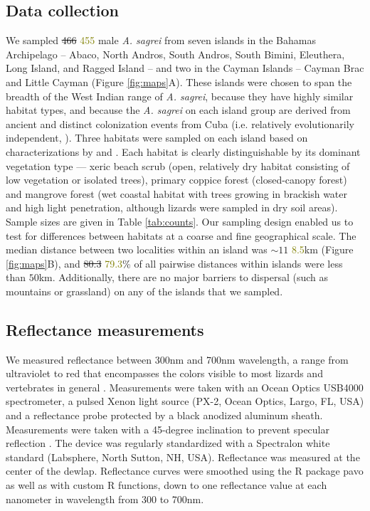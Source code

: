 \subsection*{Data collection}

We sampled \sout{466} \textcolor{olive}{455} male \textit{A. sagrei} from seven islands in the Bahamas Archipelago -- Abaco, North Andros, South Andros, South Bimini, Eleuthera, Long Island, and Ragged Island -- and two in the Cayman Islands -- Cayman Brac and Little Cayman (Figure \ref{fig:maps}A). These islands were chosen to span the breadth of the West Indian range of \textit{A. sagrei}, because they have highly similar habitat types,  and because the \textit{A. sagrei} on each island group are derived from ancient and distinct colonization events from Cuba (i.e. relatively evolutionarily independent, \citealt{Reynolds2020}). Three habitats were sampled on each island based on characterizations by \citet{Howard1950} and \citet{Schoener1968}. Each habitat is clearly distinguishable by its dominant vegetation type --- xeric beach scrub (open, relatively dry habitat consisting of low vegetation or isolated trees), primary coppice forest (closed-canopy forest) and mangrove forest (wet coastal habitat with trees growing in brackish water and high light penetration, although lizards were sampled in dry soil areas). Sample sizes are given in Table \ref{tab:counts}. Our sampling design enabled us to test for differences between habitats at a coarse and fine geographical scale. The median distance between two localities within an island was \sout{$\sim 11$} \textcolor{olive}{8.5}km (Figure \ref{fig:maps}B), and \sout{80.3} \textcolor{olive}{79.3}\% of all pairwise distances within islands were less than $50$km. Additionally, there are no major barriers to dispersal (such as mountains or grassland) on any of the islands that we sampled.

\subsection*{Reflectance measurements}

We measured reflectance between 300nm and 700nm wavelength, a range from ultraviolet to red that encompasses the colors visible to most lizards and vertebrates in general \citep{Lazareva2012}. Measurements were taken with an Ocean Optics USB4000 spectrometer, a pulsed Xenon light source (PX-2, Ocean Optics, Largo, FL, USA) and a reflectance probe protected by a black anodized aluminum sheath. Measurements were taken with a 45-degree inclination to prevent specular reflection \citep{Endler1990}. The device was regularly standardized with a Spectralon white standard (Labsphere, North Sutton, NH, USA). Reflectance was measured at the center of the dewlap. Reflectance curves were smoothed using the R package pavo \citep{Maia2013} as well as with custom R functions, down to one reflectance value at each nanometer in wavelength from 300 to 700nm. 


